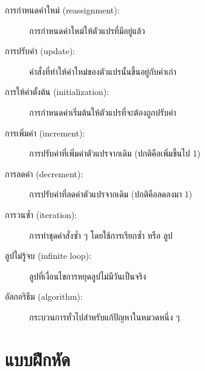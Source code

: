 \begin{description}

\item[การกำหนดค่าใหม่ (reassignment):] การกำหนดค่าใหม่ให้ตัวแปรที่มีอยู่แล้ว

\item[การปรับค่า (update):] คำสั่งที่ทำให้ค่าใหม่ของตัวแปรนั้นขึ้นอยู่กับค่าเก่า

\item[การให้ค่าตั้งต้น (initialization):] การกำหนดค่าเริ่มต้นให้ตัวแปรที่จะต้องถูกปรับค่า

\item[การเพิ่มค่า (increment):] การปรับค่าที่เพิ่มค่าตัวแปรจากเดิม (ปกติคือเพิ่มขึ้นไป 1)

\item[การลดค่า (decrement):] การปรับค่าที่ลดค่าตัวแปรจากเดิม (ปกติคือลดลงมา 1)

\item[การวนซ้ำ (iteration):] การทำชุดคำสั่งซ้ำ ๆ โดยใช้การเรียกซ้ำ หรือ ลูป

\item[ลูปไม่รู้จบ (infinite loop):] ลูปที่เงื่อนไขการหยุดลูปไม่มีวันเป็นจริง

\item[อัลกอริธึม (algorithm):]  กระบวนการทั่วไปสำหรับแก้ปัญหาในหมวดหนึ่ง ๆ

\end{description}


\section{แบบฝึกหัด}


